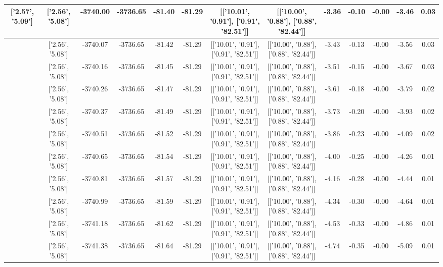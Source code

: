 \begin{table}[htbp]
\begin{adjustbox}{angle=90}
\begin{tabular}{|c|c|c|c|c|c|c|c|c|c|c|c|c|}
 ['2.57', '5.09'] & ['2.56', '5.08'] & -3740.00 & -3736.65 & -81.40 & -81.29 & [['10.01', '0.91'], ['0.91', '82.51']] & [['10.00', '0.88'], ['0.88', '82.44']] & -3.36 & -0.10 & -0.00 & -3.46 & 0.03\\ \hline
 ['2.57', '5.09'] & ['2.56', '5.08'] & -3740.07 & -3736.65 & -81.42 & -81.29 & [['10.01', '0.91'], ['0.91', '82.51']] & [['10.00', '0.88'], ['0.88', '82.44']] & -3.43 & -0.13 & -0.00 & -3.56 & 0.03\\ \hline
 ['2.57', '5.09'] & ['2.56', '5.08'] & -3740.16 & -3736.65 & -81.45 & -81.29 & [['10.01', '0.91'], ['0.91', '82.51']] & [['10.00', '0.88'], ['0.88', '82.44']] & -3.51 & -0.15 & -0.00 & -3.67 & 0.03\\ \hline
 ['2.57', '5.09'] & ['2.56', '5.08'] & -3740.26 & -3736.65 & -81.47 & -81.29 & [['10.01', '0.91'], ['0.91', '82.51']] & [['10.00', '0.88'], ['0.88', '82.44']] & -3.61 & -0.18 & -0.00 & -3.79 & 0.02\\ \hline
 ['2.57', '5.09'] & ['2.56', '5.08'] & -3740.37 & -3736.65 & -81.49 & -81.29 & [['10.01', '0.91'], ['0.91', '82.51']] & [['10.00', '0.88'], ['0.88', '82.44']] & -3.73 & -0.20 & -0.00 & -3.93 & 0.02\\ \hline
 ['2.57', '5.09'] & ['2.56', '5.08'] & -3740.51 & -3736.65 & -81.52 & -81.29 & [['10.01', '0.91'], ['0.91', '82.51']] & [['10.00', '0.88'], ['0.88', '82.44']] & -3.86 & -0.23 & -0.00 & -4.09 & 0.02\\ \hline
 ['2.58', '5.09'] & ['2.56', '5.08'] & -3740.65 & -3736.65 & -81.54 & -81.29 & [['10.01', '0.91'], ['0.91', '82.51']] & [['10.00', '0.88'], ['0.88', '82.44']] & -4.00 & -0.25 & -0.00 & -4.26 & 0.01\\ \hline
 ['2.58', '5.09'] & ['2.56', '5.08'] & -3740.81 & -3736.65 & -81.57 & -81.29 & [['10.01', '0.91'], ['0.91', '82.51']] & [['10.00', '0.88'], ['0.88', '82.44']] & -4.16 & -0.28 & -0.00 & -4.44 & 0.01\\ \hline
 ['2.58', '5.09'] & ['2.56', '5.08'] & -3740.99 & -3736.65 & -81.59 & -81.29 & [['10.01', '0.91'], ['0.91', '82.51']] & [['10.00', '0.88'], ['0.88', '82.44']] & -4.34 & -0.30 & -0.00 & -4.64 & 0.01\\ \hline
 ['2.58', '5.09'] & ['2.56', '5.08'] & -3741.18 & -3736.65 & -81.62 & -81.29 & [['10.01', '0.91'], ['0.91', '82.51']] & [['10.00', '0.88'], ['0.88', '82.44']] & -4.53 & -0.33 & -0.00 & -4.86 & 0.01\\ \hline
 ['2.58', '5.09'] & ['2.56', '5.08'] & -3741.38 & -3736.65 & -81.64 & -81.29 & [['10.01', '0.91'], ['0.91', '82.51']] & [['10.00', '0.88'], ['0.88', '82.44']] & -4.74 & -0.35 & -0.00 & -5.09 & 0.01\\ \hline

\end{tabular}
\end{adjustbox}
\end{table}
